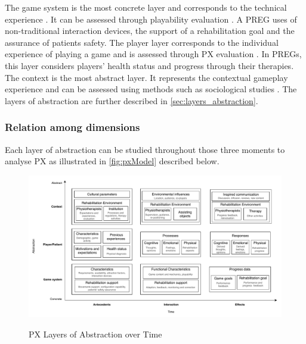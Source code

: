 The game system is the most concrete layer and corresponds to the technical experience \autocite{Engl2013,Nackea2}. It can be assessed through playability evaluation \autocite{Engl2013,Nacked,Nackea2}. A \ac{PREG} uses of non-traditional interaction devices, the support of a rehabilitation goal and the assurance of patients safety. The player layer corresponds to the individual experience of playing a game \autocite{Engl2013,Nackea2} and is assessed through \ac{PX} evaluation \autocite{Engl2013,Nacked,Nackea2,Elson2014}. In \acp{PREG}, this layer considers players' health status and progress through their therapies. The context is the most abstract layer. It represents the contextual gameplay experience \autocite{Engl2013} and can be assessed using methods such as sociological studies \autocite{Nacked}. The layers of abstraction are further described in \autoref{sec:layers_abstraction}.

\subsubsection{Relation among dimensions}
\label{sec:rel_among_dimensions}
Each layer of abstraction can be studied throughout those three moments to analyse \ac{PX} as illustrated in \autoref{fig:pxModel} described below.

\begin{figure}[bth]
\myfloatalign
{\includegraphics[width=\linewidth]{gfx/model/pxModel}} \quad
\caption{\ac{PX} Layers of Abstraction over Time}\label{fig:pxModel}
\end{figure}

